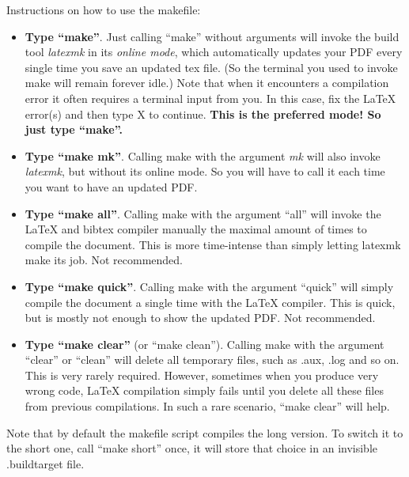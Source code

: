 Instructions on how to use the makefile:
\begin{itemize}
  \item \textbf{Type ``make''}. Just calling ``make'' without arguments will invoke the build tool \emph{latexmk} in its \emph{online mode}, which automatically updates your PDF every single time you save an updated tex file. (So the terminal you used to invoke make will remain forever idle.) Note that when it encounters a compilation error it often requires a terminal input from you. In this case, fix the \LaTeX{} error(s) and then type X to continue. \textbf{This is the preferred mode! So just type ``make''.}
  \item \textbf{Type ``make mk''}. Calling make with the argument \emph{mk} will also invoke \emph{latexmk}, but without its online mode. So you will have to call it each time you want to have an updated PDF.
  \item \textbf{Type ``make all''}. Calling make with the argument ``all'' will invoke the \LaTeX{} and bibtex compiler manually the maximal amount of times to compile the document. This is more time-intense than simply letting latexmk make its job. Not recommended.
  \item  \textbf{Type ``make quick''}. Calling make with the argument ``quick'' will simply compile the document a single time with the \LaTeX{} compiler. This is quick, but is mostly not enough to show the updated PDF. Not recommended.
  \item \textbf{Type ``make clear''} (or ``make clean''). Calling make with the argument ``clear'' or ``clean'' will delete all temporary files, such as .aux, .log and so on. This is very rarely required. However, sometimes when you produce very wrong code, \LaTeX{} compilation simply fails until you delete all these files from previous compilations. In such a rare scenario, ``make clear'' will help.
\end{itemize}

Note that by default the makefile script compiles the long version. To switch it to the short one, call ``make short'' once, it will store that choice in an invisible .buildtarget file.